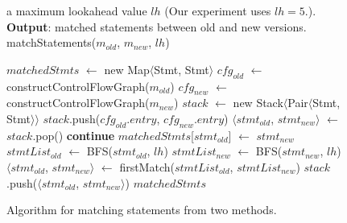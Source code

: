 \begin{figure}[t]
\quad a maximum lookahead value $\mathit{lh}$ (Our experiment uses $\mathit{lh}=5$.).\\
\textbf{Output}: matched statements between old and new versions.
\vspace{-4mm}%
matchStatements($\mathit{m_{old}}$, $\mathit{m_{new}}$, $\mathit{lh}$)\\
\begin{algorithmic}[1]
\STATE $\mathit{matchedStmts}$ $\leftarrow$ new Map$\langle$Stmt, Stmt$\rangle$
\STATE $\mathit{cfg_{old}}$ $\leftarrow$ constructControlFlowGraph($\mathit{m_{old}}$)
\STATE $\mathit{cfg_{new}}$ $\leftarrow$ constructControlFlowGraph($\mathit{m_{new}}$)
\STATE $\mathit{stack}$ $\leftarrow$ new Stack$\langle$Pair$\langle$Stmt, Stmt$\rangle$$\rangle$
\STATE $\mathit{stack}$.push($\mathit{cfg_{old}}$.$\mathit{entry}$, $\mathit{cfg_{new}}$.$\mathit{entry}$)
\STATE $\langle$$\mathit{stmt_{old}}$, $\mathit{stmt_{new}}$$\rangle$ $\leftarrow$ $\mathit{stack}$.pop()
\STATE \textbf{continue}
\ENDIF
{}
\STATE $\mathit{matchedStmts}$[$\mathit{stmt_{old}}$] $\leftarrow$ $\mathit{stmt_{new}}$
\ELSE
\STATE $\mathit{stmtList_{old}}$ $\leftarrow$ BFS($\mathit{stmt_{old}}$, $\mathit{lh}$)
\STATE $\mathit{stmtList_{new}}$ $\leftarrow$ BFS($\mathit{stmt_{new}}$, $\mathit{lh}$)
\STATE $\langle$$\mathit{stmt_{old}}$, $\mathit{stmt_{new}}$$\rangle$ $\leftarrow$ firstMatch($\mathit{stmtList_{old}}$, $\mathit{stmtList_{new}}$)
\STATE $\mathit{stack}$.push($\langle$$\mathit{stmt_{old}}$, $\mathit{stmt_{new}}$$\rangle$)
\ENDIF
\ENDIF
\ENDWHILE
\RETURN $\mathit{matchedStmts}$
\end{algorithmic}
\vspace{-4mm}
\caption{Algorithm for matching statements from two methods.
\label{fig:matching}
}
\end{figure}
